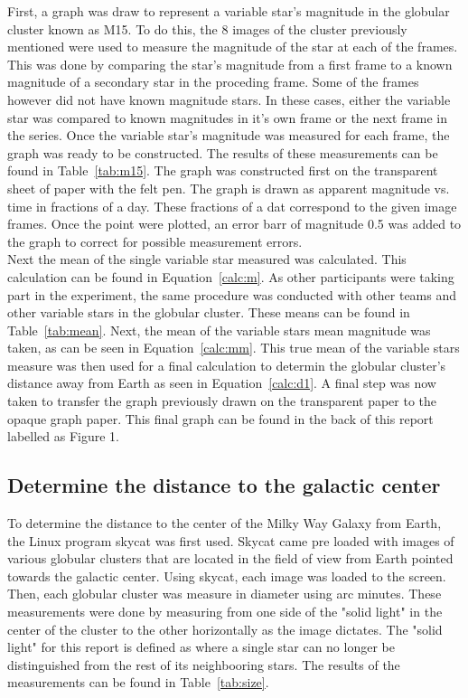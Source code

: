 \documentclass{article}
\begin{document}
First, a graph was draw to represent a variable star's magnitude in the globular cluster
known as M15. To do this, the 8 images of the cluster previously mentioned were used to
measure the magnitude of the star at each of the frames. This was done by comparing the
star's magnitude from a first frame to a known magnitude of a secondary star in the proceding
frame. Some of the frames however did not have known magnitude stars. In these cases, either
the variable star was compared to known magnitudes in it's own frame or the next frame in
the series. Once the variable star's magnitude was measured for each frame, the graph
was ready to be constructed. The results of these measurements can be found in
Table~\ref{tab:m15}. The graph was constructed first on the transparent sheet of paper with
the felt pen. The graph is drawn as apparent magnitude vs. time in fractions of a day.
These fractions of a dat correspond to the given image frames. Once the point were plotted,
an error barr of magnitude 0.5 was added to the graph to correct for possible measurement
errors. \\

Next the mean of the single variable star measured was calculated. This calculation
can be found in Equation~\ref{calc:m}. As other participants were taking part in the
experiment, the same procedure was conducted with other teams and other variable stars
in the globular cluster. These means can be found in Table~\ref{tab:mean}. Next, 
the mean of the variable stars mean magnitude was taken, as can be seen in 
Equation~\ref{calc:mm}. This true mean of the variable stars measure was then used
for a final calculation to determin the globular cluster's distance away from Earth
as seen in Equation~\ref{calc:d1}. A final step was now taken to transfer the 
graph previously drawn on the transparent paper to the opaque graph paper. This final
graph can be found in the back of this report labelled as Figure 1.

\subsection{Determine the distance to the galactic center}

To determine the distance to the center of the Milky Way Galaxy from Earth, the Linux
program skycat was first used. Skycat came pre loaded with images of various globular
clusters that are located in the field of view from Earth pointed towards the 
galactic center. Using skycat, each image was loaded to the screen. Then, each globular
cluster was measure in diameter using arc minutes. These measurements were done by 
measuring from one side of the "solid light" in the center of the cluster to the other
horizontally as the image dictates. The "solid light" for this report is defined as
where a single star can no longer be distinguished from the rest of its neighbooring 
stars. The results of the measurements can be found in Table~\ref{tab:size}. \\
\end{document}
